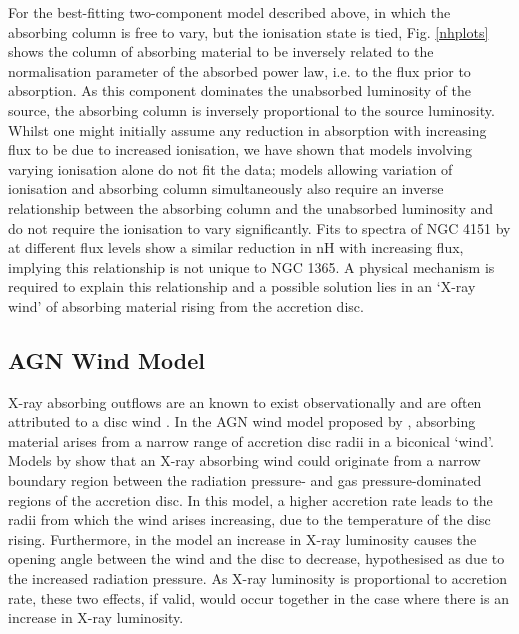\documentclass[useAMS,usenatbib]{sam}
\begin{document}
For the best-fitting two-component model described above, in which the absorbing column is free to vary, but the ionisation state is tied, Fig. \ref{nhplots} shows the
column of absorbing material to be inversely related to the normalisation parameter of the absorbed power law, i.e. to the flux prior to absorption. As this component
dominates the unabsorbed luminosity of the source, the absorbing column is inversely proportional to the source luminosity. Whilst one might initially assume any
reduction in absorption with increasing flux to be due to increased ionisation, we have shown that models involving varying ionisation alone do not fit the data; models
allowing variation of ionisation and absorbing column simultaneously also require an inverse relationship between the absorbing column and the unabsorbed luminosity and
do not require the ionisation to vary significantly. Fits to spectra of NGC 4151 by \citet{lubinski10} at different flux levels show a similar reduction in nH with
increasing flux, implying this relationship is not unique to NGC 1365. A physical mechanism is required to explain this relationship and a possible solution lies in an
`X-ray wind’ of absorbing material rising from the accretion disc.

\subsection{AGN Wind Model}

X-ray absorbing outflows are an known to exist observationally and are often attributed to a disc wind \citep{tombesi}. In the AGN wind model proposed by \citet{elvis},
absorbing material arises from a narrow range of accretion disc radii in a biconical `wind'. Models by \citet{nicastro} show that an X-ray absorbing wind could originate
from a narrow boundary region between the radiation pressure- and gas pressure-dominated regions of the accretion disc. In this model, a higher accretion rate leads to
the radii from which the wind arises increasing, due to the temperature of the disc rising. Furthermore, in the \citet{elvis} model an increase in X-ray luminosity causes
the opening angle between the wind and the disc to decrease, hypothesised as due to the increased radiation pressure. As X-ray luminosity is proportional to accretion
rate, these two effects, if valid, would occur together in the case where there is an increase in X-ray luminosity.
\end{document}
